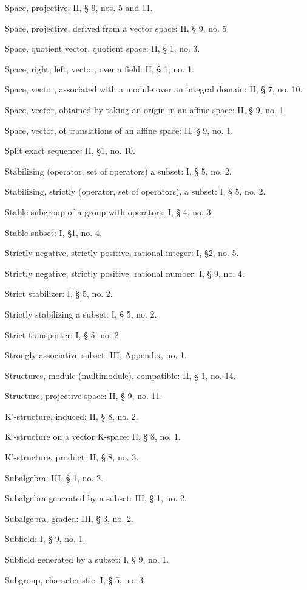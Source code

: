 Space, projective: II, § 9, nos. 5 and 11.

Space, projective, derived from a vector space: II, § 9, no. 5.

Space, quotient vector, quotient space: II, § 1, no. 3.

Space, right, left, vector, over a field: II, § 1, no. 1.

Space, vector, associated with a module over an integral domain: II, § 7, no. 10.

Space, vector, obtained by taking an origin in an affine space: II, § 9, no. 1.

Space, vector, of translations of an affine space: II, § 9, no. 1.

Split exact sequence: II, §1, no. 10.

Stabilizing (operator, set of operators) a subset: I, § 5, no. 2.

Stabilizing, strictly (operator, set of operators), a subset: I, § 5, no. 2.

Stable subgroup of a group with operators: I, § 4, no. 3.

Stable subset: I, §1, no. 4.

Strictly negative, strictly positive, rational integer: I, §2, no. 5.

Strictly negative, strictly positive, rational number: I, § 9, no. 4.

Strict stabilizer: I, § 5, no. 2.

Strictly stabilizing a subset: I, § 5, no. 2.

Strict transporter: I, § 5, no. 2.

Strongly associative subset: III, Appendix, no. 1.

Structures, module (multimodule), compatible: II, § 1, no. 14.

Structure, projective space: II, § 9, no. 11.

K'-structure, induced: II, § 8, no. 2.

K'-structure on a vector K-space: II, § 8, no. 1.

K'-structure, product: II, § 8, no. 3.

Subalgebra: III, § 1, no. 2.

Subalgebra generated by a subset: III, § 1, no. 2.

Subalgebra, graded: III, § 3, no. 2.

Subfield: I, § 9, no. 1.

Subfield generated by a subset: I, § 9, no. 1.

Subgroup, characteristic: I, § 5, no. 3.

